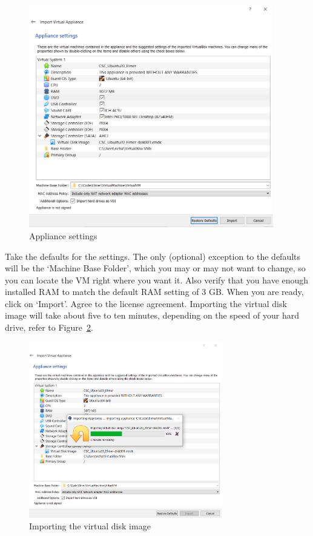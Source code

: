 \begin{figure}[H]
\begin{center}
\includegraphics[width=0.95\textwidth]{virt-4}
\caption{Appliance settings}\label{fg:virt-4}
\end{center}
\end{figure}

Take the defaults for the settings.  The only (optional) exception to the defaults will be the `Machine Base Folder', which you may or may not want to change, so you can locate the VM right where you want it.  Also verify that you have enough installed RAM to match the default RAM setting of 3 GB.  When you are ready, click on `Import'.  Agree to the license agreement.  Importing the virtual disk image will take about five to ten minutes, depending on the speed of your hard drive, refer to Figure~\ref{fg:virt-5}.

\begin{figure}[H]
\begin{center}
\includegraphics[width=0.75\textwidth]{virt-5}
\caption{Importing the virtual disk image}\label{fg:virt-5}
\end{center}
\end{figure}

